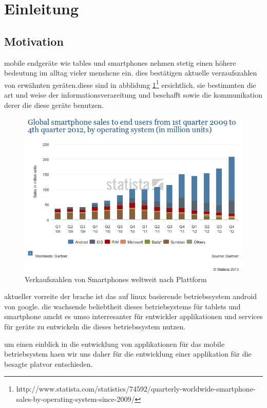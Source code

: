 \section{Einleitung}
\subsection{Motivation}
mobile endgeräte wie tables und smartphones nehmen stetig einen höhere bedeutung im alltag vieler menshcne ein. dies bestätigen aktuelle verzaufszahlen von erwähnten geräten.diese sind in abblidung \ref{sale1}\footnote{http://www.statista.com/statistics/74592/quarterly-worldwide-smartphone-sales-by-operating-system-since-2009/} ersichtlich. sie bestimmten die art und weise der informationsverareitung und beschafft sowie die kommunikation derer die diese geräte benutzen.


\begin{figure}
\begin{center}
\includegraphics[scale=0.6]{images/sale}
\caption{Verkaufszahlen von Smartphones weltweit nach Plattform}
\label{sale1}
\end{center}
\end{figure}


aktueller vorreite der brache ist das auf linux basierende betriebssystem android von google. die wachsende beliebtheit dieses betriebsystems für tablets und smartphone amcht es umso interresanter für entwickler applikationen und services für geräte zu entwickeln die dieses betriebssystem nutzen.

um einen einblick in die entwicklung von applikationen für das mobile betriebsystem haen wir uns daher für die entwicklung einer applikation für die besagte platvor entschieden.

